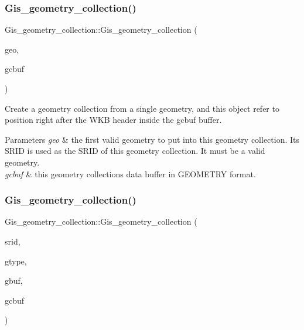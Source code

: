 \subsubsection{\texorpdfstring{Gis\+\_\+geometry\+\_\+collection()}{Gis\_geometry\_collection()}\hspace{0.1cm}{\footnotesize\ttfamily [1/2]}}
{\footnotesize\ttfamily Gis\+\_\+geometry\+\_\+collection\+::\+Gis\+\_\+geometry\+\_\+collection (\begin{DoxyParamCaption}\item[{\mbox{\hyperlink{classGeometry}{Geometry}} $\ast$}]{geo,  }\item[{String $\ast$}]{gcbuf }\end{DoxyParamCaption})}

Create a geometry collection from a single geometry, and this object refer to position right after the W\+KB header inside the \textquotesingle{}gcbuf\textquotesingle{} buffer. 
\begin{DoxyParams}{Parameters}
{\em geo} & the first valid geometry to put into this geometry collection. Its S\+R\+ID is used as the S\+R\+ID of this geometry collection. It must be a valid geometry. \\
\hline
{\em gcbuf} & this geometry collection\textquotesingle{}s data buffer in G\+E\+O\+M\+E\+T\+RY format. \\
\hline
\end{DoxyParams}
\mbox{\label{classGis__geometry__collection_adfa2c5172a88f12e6e01767e6ca30eb5}} 
\subsubsection{\texorpdfstring{Gis\+\_\+geometry\+\_\+collection()}{Gis\_geometry\_collection()}\hspace{0.1cm}{\footnotesize\ttfamily [2/2]}}
{\footnotesize\ttfamily Gis\+\_\+geometry\+\_\+collection\+::\+Gis\+\_\+geometry\+\_\+collection (\begin{DoxyParamCaption}\item[{srid\+\_\+t}]{srid,  }\item[{wkb\+Type}]{gtype,  }\item[{const String $\ast$}]{gbuf,  }\item[{String $\ast$}]{gcbuf }\end{DoxyParamCaption})}

